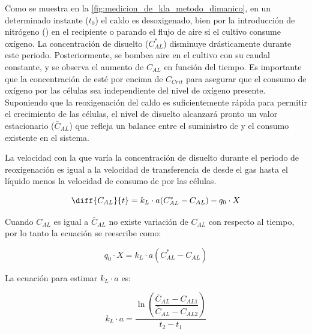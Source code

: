 \documentclass{AsignaturaResumen}
\begin{document}
Como se muestra en la \autoref{fig:medicion_de_kla_metodo_dimanico}, en un determinado instante ($t_{0}$) el caldo es desoxigenado, bien por la introducción de nitrógeno () en el recipiente o parando el flujo de aire si el cultivo consume oxígeno. La concentración de  disuelto ($C_{AL}^{\ast}$) disminuye drásticamente durante este periodo. Posteriormente, se bombea aire en el cultivo con su caudal constante, y se observa el aumento de $C_{AL}$ en función del tiempo. Es importante que la concentración de  esté por encima de $C_{Crit}$ para asegurar que el consumo de oxígeno por las células sea independiente del nivel de oxígeno presente. Suponiendo que la reoxigenación del caldo es suficientemente rápida para permitir el crecimiento de las células, el nivel de  disuelto alcanzará pronto un valor estacionario ($\bar{C}_{AL}$) que refleja un balance entre el suministro de  y el consumo existente en el sistema.

La velocidad con la que varía la concentración de  disuelto durante el periodo de reoxigenación es igual a la velocidad de transferencia de  desde el gas hasta el líquido menos la velocidad de consumo de  por las células.

\begin{equation}
    \diff{C_{AL}}{t} = k_{L} \cdot a (C_{AL}^{\ast} - C_{AL}) - q_{0} \cdot X
\end{equation}

Cuando $C_{AL}$ es igual a $\bar{C}_{AL}$ no existe variación de $C_{AL}$ con respecto al tiempo, por lo tanto la ecuación se reescribe como:

\begin{equation}
    q_{0} \cdot X = k_{L} \cdot a (C_{AL}^{\ast} - C_{AL})
\end{equation}

La ecuación para estimar $k_{L} \cdot a$ es:

\begin{equation}\label{eq:medicion_de_kla_pendiente}
    k_{L} \cdot a = \frac{\ln\left(\dfrac{\bar{C}_{AL} - C_{AL1}}{\bar{C}_{AL} - C_{AL2}}\right)}{t_{2} - t_{1}}
\end{equation}
\end{document}
